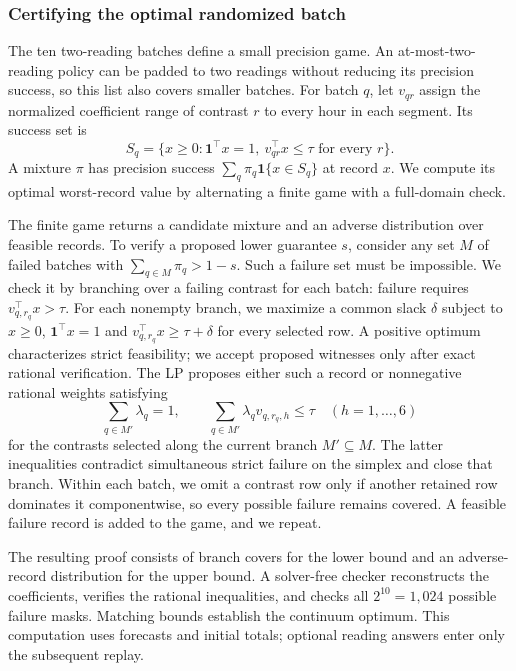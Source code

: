 \documentclass[12pt]{article}
\begin{document}
\subsubsection{Certifying the optimal randomized batch}
\label{sec:complete-batch-precision}
The ten two-reading batches define a small precision game. An
at-most-two-reading policy can be padded to two readings without
reducing its precision success, so this list also covers smaller batches.
For batch $q$,
let $v_{qr}$ assign the normalized coefficient range of contrast $r$ to
every hour in each segment. Its success set is
\[
 S_q=\{x\geq0:\mathbf1^\top x=1,\ v_{qr}^\top x\leq\tau
       \text{ for every }r\}.
\]
A mixture $\pi$ has precision success
$\sum_q\pi_q\mathbf1\{x\in S_q\}$ at record $x$. We compute its optimal
worst-record value by alternating a finite game with a full-domain check.

The finite game returns a candidate mixture and an adverse distribution
over feasible records. To verify a proposed lower guarantee $s$, consider
any set $M$ of failed batches with $\sum_{q\in M}\pi_q>1-s$.
Such a failure set must be impossible. We check it by branching over a
failing contrast for each batch: failure requires
$v_{q,r_q}^\top x>\tau$. For each nonempty branch, we maximize a common
slack $\delta$ subject to $x\geq0$, $\mathbf1^\top x=1$ and
$v_{q,r_q}^\top x\geq\tau+\delta$ for every selected row.
A positive optimum characterizes strict feasibility; we accept proposed
witnesses only after exact rational verification. The LP proposes either
such a record or nonnegative rational weights satisfying
\[
 \sum_{q\in M'}\lambda_q=1,\qquad
 \sum_{q\in M'}\lambda_q v_{q,r_q,h}\leq\tau
 \quad(h=1,\ldots,6)
\]
for the contrasts selected along the current branch $M'\subseteq M$.
The latter inequalities contradict simultaneous strict failure on the
simplex and close that branch. Within each batch, we omit a contrast row
only if another retained row dominates it componentwise, so every possible
failure remains covered.
A feasible failure record is added to the game, and we repeat.

The resulting proof consists of branch covers for the lower bound and an
adverse-record distribution for the upper bound. A solver-free checker
reconstructs the coefficients, verifies the rational inequalities, and
checks all $2^{10}=1{,}024$ possible failure masks. Matching bounds establish
the continuum optimum. This computation uses forecasts and initial totals;
optional reading answers enter only the subsequent replay.
\end{document}
